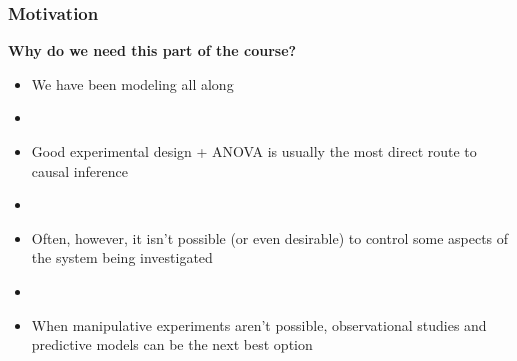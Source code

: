 \documentclass[color=usenames,dvipsnames]{beamer}\usepackage[]{graphicx}\usepackage[]{color}
\begin{document}
\begin{frame}
  \frametitle{Motivation}
  \large
  {\bf Why do we need this part of the course? \par}
  \pause
  \begin{itemize}%
    \item<2-> We have been modeling all along
    \item[]
    \item<3-> Good experimental design + ANOVA is usually the most direct
      route to causal inference
    \item[]
    \item<4-> Often, however, it isn't possible (or even desirable) to
      control some aspects of the system being investigated
    \item[]
    \item<5-> When manipulative experiments aren't %
      possible, observational studies
      and predictive models can be the next best option
  \end{itemize}
\end{frame}








\end{document}

